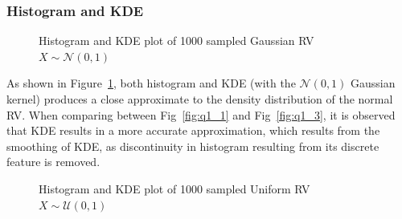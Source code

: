 \documentclass[11pt, twocolumn]{article}
\begin{document}
\subsubsection{Histogram and KDE}

\begin{figure}[htbp]
    \centering
    \caption{Histogram and KDE plot of 1000 sampled Gaussian RV $X\sim \mathcal{N}(0, 1)$}
    \label{fig:q1normal}
\end{figure}

As shown in Figure~\ref{fig:q1normal}, both histogram and KDE (with the $\mathcal{N}(0, 1)$ Gaussian kernel) produces a close approximate to the density distribution of the normal RV. 
When comparing between Fig~\ref{fig:q1_1} and Fig~\ref{fig:q1_3}, it is observed that KDE results in a more accurate approximation, which results from the smoothing of KDE, as discontinuity in histogram resulting from its discrete feature is removed.
\vspace{-1em}
\begin{figure}[htbp]
    \centering
    \caption{Histogram and KDE plot of 1000 sampled Uniform RV $X\sim\mathcal{U}(0, 1)$}
    \label{fig:q1uniform}
\end{figure}
\end{document}
